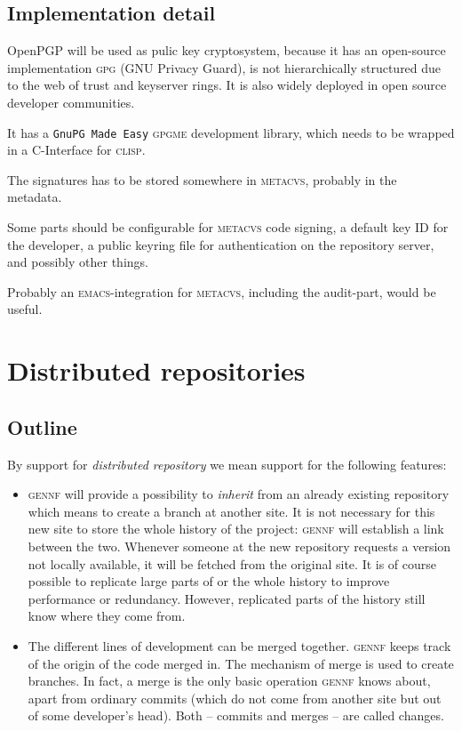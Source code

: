 \documentclass[fleqn, 10pt, a4paper]{report}
\begin{document}
\subsection{Implementation detail}
OpenPGP will be used as pulic key cryptosystem, because it has an
open-source implementation \textsc{gpg} (GNU Privacy Guard), is not
hierarchically structured due to the web of trust and keyserver rings.
It is also widely deployed in open source developer communities.

It has a \texttt{GnuPG Made Easy} \textsc{gpgme} development library,
which needs to be wrapped in a C-Interface for \textsc{clisp}.

The signatures has to be stored somewhere in \textsc{metacvs}, probably
in the metadata.

Some parts should be configurable for \textsc{metacvs} code signing,
a default key ID for the developer, a public keyring file for authentication
on the repository server, and possibly other things.

Probably an \textsc{emacs}-integration for \textsc{metacvs}, including the
audit-part, would be useful.


\section{Distributed repositories \label{distrib}}

\subsection{Outline}

By support for \emph{distributed repository} we mean support for the following
features:

\begin{itemize}
\item \textsc{gennf} will provide a possibility to \emph{inherit} from an
already existing repository which means to create a branch
at another site. It is not necessary for this new site to store the
whole history of the project: \textsc{gennf} will establish
a link between the two.
Whenever someone at the new repository requests a version not locally
available, it will be fetched from the original site. It is of course
possible to replicate large parts of or the whole history to improve
performance or redundancy. However, replicated parts of the history still
know where they come from.

\item The different lines of development can be merged together.
\textsc{gennf} keeps track of the origin of the code merged in. The mechanism
of merge is used to create branches. In fact, a merge is the only
basic operation \textsc{gennf} knows about, apart from ordinary commits (which
do not come from another site but out of some developer's head).
Both -- commits and merges -- are called changes.
\end{itemize}
\end{document}
